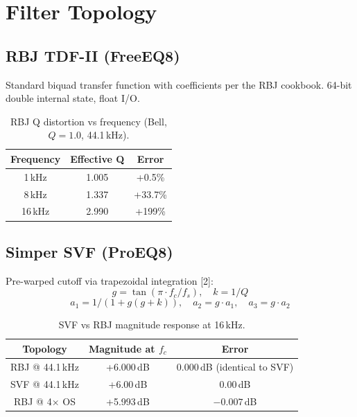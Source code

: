 \documentclass[10pt,twocolumn,a4paper]{article}
\begin{document}
\section{Filter Topology}

\subsection{RBJ TDF-II (FreeEQ8)}
Standard biquad transfer function with coefficients per the RBJ cookbook. 64-bit double internal state, float I/O.

\begin{table}[ht]
  \caption{RBJ Q distortion vs frequency (Bell, $Q=1.0$, 44.1\,kHz).}
  \centering
  \begin{tabular}{ccc}\toprule
    Frequency & Effective Q & Error \\\midrule
    1\,kHz & 1.005 & +0.5\% \\
    8\,kHz & 1.337 & +33.7\% \\
    16\,kHz & 2.990 & +199\% \\\bottomrule
  \end{tabular}
  \label{tab:qdistortion}
\end{table}

\subsection{Simper SVF (ProEQ8)}
Pre-warped cutoff via trapezoidal integration [2]:
\begin{equation}
g = \tan(\pi \cdot f_c / f_s), \quad k = 1/Q
\end{equation}
\begin{equation}
a_1 = 1 / (1 + g(g + k)), \quad a_2 = g \cdot a_1, \quad a_3 = g \cdot a_2
\end{equation}

\begin{table}[ht]
  \caption{SVF vs RBJ magnitude response at 16\,kHz.}
  \centering
  \begin{tabular}{ccc}\toprule
    Topology & Magnitude at $f_c$ & Error \\\midrule
    RBJ @ 44.1\,kHz & +6.000\,dB & $0.000$\,dB (identical to SVF) \\
    SVF @ 44.1\,kHz & +6.00\,dB & 0.00\,dB \\
    RBJ @ 4$\times$ OS & +5.993\,dB & $-0.007$\,dB \\\bottomrule
  \end{tabular}
  \label{tab:svfvsrbj}
\end{table}
\end{document}
